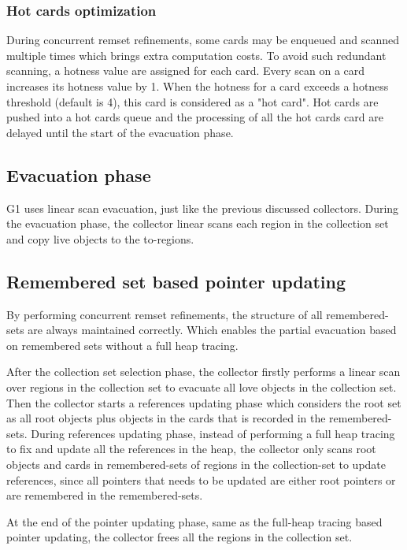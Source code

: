 \subsubsection{Hot cards optimization}

During concurrent remset refinements, some cards may be enqueued and scanned multiple times
which brings extra computation costs. To avoid such redundant scanning,
a hotness value are assigned for each card. Every scan on a card increases its hotness value by 1.
When the hotness for a card exceeds a hotness threshold (default is 4), this card is considered
as a "hot card". Hot cards are pushed into a hot cards queue and the processing
of all the hot cards card are delayed until the start of the evacuation phase.

\subsection{Evacuation phase}

G1 uses linear scan evacuation, just like the previous discussed collectors.
During the evacuation phase, the collector linear scans each region in the collection
set and copy live objects to the to-regions.

\subsection{Remembered set based pointer updating}

By performing concurrent remset refinements, the structure of all remembered-sets are always maintained correctly.
Which enables the partial evacuation based on remembered sets without a full heap tracing.

After the collection set selection phase, the collector firstly performs a linear
scan over regions in the collection set to evacuate all love objects in the collection set.
Then the collector starts a references updating phase which considers
the root set as all root objects plus objects in the cards that is recorded in the remembered-sets.
During references updating phase, instead of performing a full heap tracing to fix and
update all the references in the heap, the collector only scans root objects and
cards in remembered-sets of regions in the collection-set to update references,
since all pointers that needs to be updated are either root pointers or are remembered in the remembered-sets.

At the end of the pointer updating phase, same as the full-heap tracing based
pointer updating, the collector frees all the regions in the collection set.

